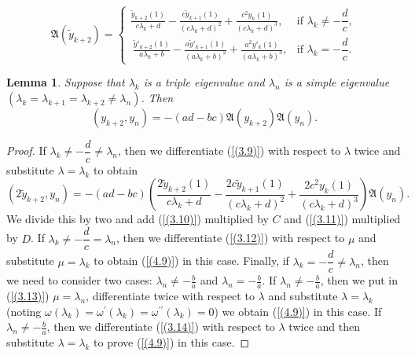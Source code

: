 \documentclass[10pt,a4paper]{amsart}
\newtheorem{lem}[thm]{Lemma}
\numberwithin{equation}{section}
\begin{document}
\begin{equation}
\mathfrak{A}(\tilde{y}_{k+2}) =
\begin{cases}
\displaystyle  
\frac{\tilde{y}_{k + 2}(1)}{c\lambda_{k} + d} - \frac{c\tilde{y}_{k+1}(1)}{\left( c\lambda_{k} + d \right)^{2}}
+\frac{c^2y_{k}(1)}{\left( c\lambda_{k} + d \right)^{3}}, 
&  \text{if }  \lambda_k \neq -\dfrac{d}{c}, \\[10pt]
\displaystyle \ 
\frac{\tilde{y}'_{k + 2}(1)}{a\lambda_{k} + b} - \frac{a\tilde{y}'_{k+1}(1)}{\left( a\lambda_{k} + b \right)^{2}}
+\frac{a^2y'_{k}(1)}{\left( a\lambda_{k} + b\right)^{3}}, 
& \text{if } \lambda_k = -\dfrac{d}{c}.
\end{cases}\label{(4.8)}
\end{equation}
\begin{lem}
Suppose that \(\lambda_{k}\) is a triple eigenvalue and \(\lambda_{n}\) is a simple  eigenvalue \((\lambda_{k}=\lambda_{k+1}=\lambda_{k+2}\ne\lambda_{n})\).
Then 
\begin{equation}
  \left( y_{k + 2},y_{n} \right) = - (ad - bc)\mathfrak{A}(y_{k+2})\mathfrak{A}(y_n)
.\label{(4.9)}  
\end{equation}
\end{lem}
\begin{proof}
If $\lambda_k \neq -\dfrac{d}{c}\neq\lambda_n$, then we differentiate (\ref{(3.9)}) with respect to $\lambda$ twice and substitute  $\lambda=\lambda_k$ to obtain
\begin{equation*}
\left( 2\tilde{y}_{k + 2},y_{n} \right) = - (ad - bc)\left(\frac{2\tilde{y}_{k + 2}(1)}{c\lambda_{k} + d} - \frac{2c\tilde{y}_{k+1}(1)}{\left( c\lambda_{k} + d \right)^{2}}
+\frac{2c^2y_{k}(1)}{\left( c\lambda_{k} + d \right)^{3}}\right)\mathfrak{A}(y_{n}). 
\end{equation*}
We divide this by two and add (\ref{(3.10)}) multiplied by $C$ and (\ref{(3.11)}) multiplied by $D$.
If $\lambda_k \neq -\dfrac{d}{c}=\lambda_n$, then we differentiate (\ref{(3.12)}) with respect to $\mu$ and substitute $\mu=\lambda_k$ to obtain (\ref{(4.9)}) in this case.
Finally, if $\lambda_k = -\dfrac{d}{c}\neq\lambda_n$, then we need to consider two cases: $\lambda_n\neq-\frac{b}{a}$ and $\lambda_n=-\frac{b}{a}$. If  $\lambda_n\neq-\frac{b}{a}$, then 
we put in (\ref{(3.13)}) $\mu=\lambda_n$, differentiate twice with respect to $\lambda$ and substitute $\lambda=\lambda_k$ (noting $\omega(\lambda_k)=\omega^\prime(\lambda_k)=\omega^{\prime\prime}(\lambda_k)=0$) we obtain (\ref{(4.9)}) in this case.
If  $\lambda_n\neq-\frac{b}{a}$, then we differentiate (\ref{(3.14)}) with respect to $\lambda$ twice and then substitute $\lambda=\lambda_k$ to prove (\ref{(4.9)}) in this case.
\end{proof}
\end{document}
